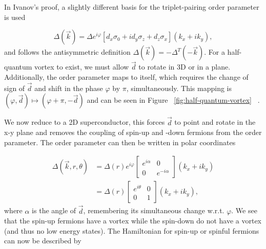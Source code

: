 In Ivanov's proof, a slightly different basis for the triplet-pairing order parameter is used

\begin{equation}
  \Delta (\vec{k}) = \Delta e^{i\varphi} \left[ d_x \sigma_0 + i d_y \sigma_z + d_z \sigma_x \right] (k_x + i k_y),
\end{equation}
and follows the antisymmetric definition $\Delta(\vec{k}) = -\Delta^T (-\vec{k})$.
For a half-quantum vortex to exist, we must allow $\vec{d}$ to rotate in 3D or in a plane.
Additionally, the order parameter maps to itself, which requires the change of sign of $\vec{d}$ and shift in the phase $\varphi$ by $\pi$, simultaneously.
This mapping is
$(\varphi, \vec{d}) \mapsto (\varphi+\pi,-\vec{d})$
and can be seen in Figure ~\ref{fig:half-quantum-vortex} ~\cite{ivanovNonAbelianStatisticsHalfQuantum2001}.

We now reduce to a 2D superconductor, this forces $\vec{d}$ to point and rotate in the x-y plane and removes the coupling of spin-up and -down fermions from the order parameter.
The order parameter can then be written in polar coordinates

\begin{align}
  \Delta (\vec{k},r,\theta) &= \Delta(r) e^{i\varphi}
  \begin{bmatrix}
    e^{i\alpha} & 0 \\
    0 & e^{-i\alpha}
  \end{bmatrix}
  (k_x + i k_y) \nonumber \\
  &= \Delta(r)
  \begin{bmatrix}
    e^{i\theta} & 0 \\
    0 & 1
  \end{bmatrix}
  (k_x + i k_y),
\end{align}
where $\alpha$ is the angle of $\vec{d}$, remembering its simultaneous change w.r.t. $\varphi$.
We see that the spin-up fermions have a vortex while the spin-down do not have a vortex (and thus no low energy states).
The Hamiltonian for spin-up or spinful fermions can now be described by


